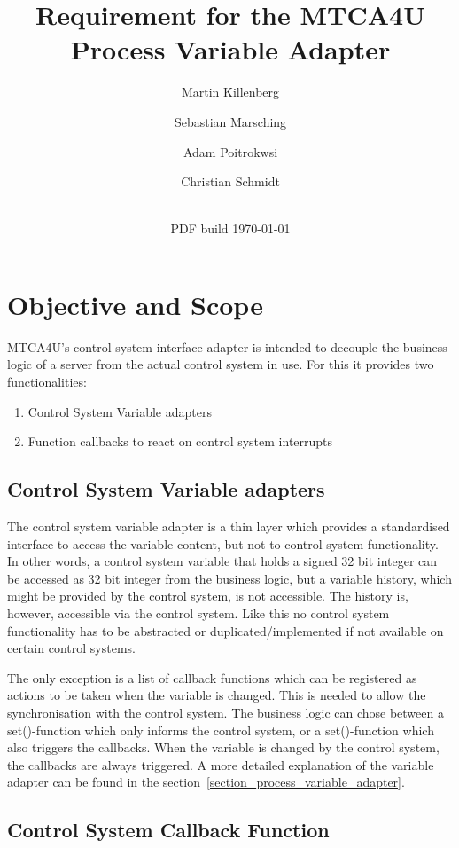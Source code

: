 \documentclass[11pt,a4paper]{scrartcl}
\title{Requirement for the MTCA4U Process Variable Adapter}
\date{\svnrevision\\ PDF build \today}
\author[1]{Martin Killenberg} \author[2]{Sebastian Marsching}
\author[3]{Adam Poitrokwsi}
\author[1]{Christian Schmidt}
\affil[1]{Deutsches Elektronen-Synchrotron DESY, Hamburg, Germany}
\affil[2]{aquenos GmbH, Baden-Baden, Germany}
\affil[3]{FastLogic Sp.\ z o.\ o., \L\'od\'z, Poland}
\begin{document}
\maketitle
\section{Objective and Scope}

MTCA4U's control system interface adapter is intended to decouple the business logic of a server from the actual control system in use. For this it provides two functionalities:
\begin{enumerate}
  \item Control System Variable adapters
  \item Function callbacks to react on control system interrupts
\end{enumerate}

\subsection{Control System Variable adapters}

The control system variable adapter is a thin layer which provides a standardised interface to access the variable content, but not to control system functionality. In other words, a control system variable that holds a signed 32 bit integer can be accessed as 32 bit integer from the business logic, but a variable history, which might be provided by the control system, is not accessible. The history is, however, accessible via the control system. Like this no control system functionality has to be abstracted or duplicated/implemented if not available on certain control systems.

The only exception is a list of callback functions which can be registered as actions to be taken when the variable is changed. This is needed to allow the synchronisation with the control system. The business logic can chose between a set()-function which only informs the control system, or a set()-function which also triggers the callbacks. When the variable is changed by the control system, the callbacks are always triggered. A more detailed explanation of the variable adapter can be found in the section~\ref{section_process_variable_adapter}.

\subsection{Control System Callback Function}
\end{document}

